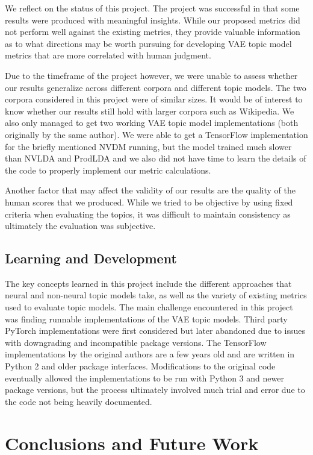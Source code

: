 \documentclass[10pt]{article}
\begin{document}
We reflect on the status of this project. The project was successful in that some results were produced with meaningful insights. While our proposed metrics did not perform well against the existing metrics, they provide valuable information as to what directions may be worth pursuing for developing VAE topic model metrics that are more correlated with human judgment.

Due to the timeframe of the project however, we were unable to assess whether our results generalize across different corpora and different topic models. The two corpora considered in this project were of similar sizes. It would be of interest to know whether our results still hold with larger corpora such as Wikipedia. We also only managed to get two working VAE topic model implementations (both originally by the same author). We were able to get a TensorFlow implementation for the briefly mentioned NVDM running, but the model trained much slower than NVLDA and ProdLDA and we also did not have time to learn the details of the code to properly implement our metric calculations.

Another factor that may affect the validity of our results are the quality of the human scores that we produced. While we tried to be objective by using fixed criteria when evaluating the topics, it was difficult to maintain consistency as ultimately the evaluation was subjective.

\subsection{Learning and Development}

The key concepts learned in this project include the different approaches that neural and non-neural topic models take, as well as the variety of existing metrics used to evaluate topic models. The main challenge encountered in this project was finding runnable implementations of the VAE topic models. Third party PyTorch implementations were first considered but later abandoned due to issues with downgrading and incompatible package versions. The TensorFlow implementations by the original authors are a few years old and are written in Python 2 and older package interfaces. Modifications to the original code eventually allowed the implementations to be run with Python 3 and newer package versions, but the process ultimately involved much trial and error due to the code not being heavily documented.


\section{Conclusions and Future Work}\label{sec:conclusion}
\end{document}
